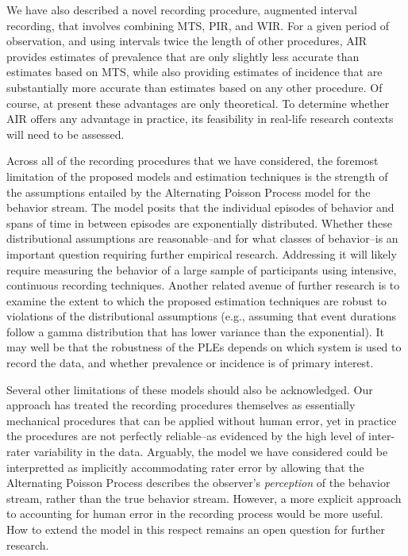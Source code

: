 \documentclass[man, noextraspace, floatsintext]{apa6}\usepackage[]{graphicx}\usepackage[]{color}
\begin{document}
We have also described a novel recording procedure, augmented interval recording, that involves combining MTS, PIR, and WIR. For a given period of observation, and using intervals twice the length of other procedures, AIR provides estimates of prevalence that are only slightly less accurate than estimates based on MTS, while also providing estimates of incidence that are substantially more accurate than estimates based on any other procedure. Of course, at present these advantages are only theoretical. To determine whether AIR offers any advantage in practice, its feasibility in real-life research contexts will need to be assessed.  

Across all of the recording procedures that we have considered, the foremost limitation of the proposed models and estimation techniques is the strength of the assumptions entailed by the Alternating Poisson Process model for the behavior stream. The model posits that the individual episodes of behavior and spans of time in between episodes are exponentially distributed. Whether these distributional assumptions are reasonable--and for what classes of behavior--is an important question requiring further empirical research. Addressing it will likely require measuring the behavior of a large sample of participants using intensive, continuous recording techniques. 
Another related avenue of further research is to examine the extent to which the proposed estimation techniques are robust to violations of the distributional assumptions (e.g., assuming that event durations follow a gamma distribution that has lower variance than the exponential). 
It may well be that the robustness of the PLEs depends on which system is used to record the data, and whether prevalence or incidence is of primary interest.

Several other limitations of these models should also be acknowledged. Our approach has treated the recording procedures themselves as essentially mechanical procedures that can be applied without human error, yet in practice the procedures are not perfectly reliable--as evidenced by the high level of inter-rater variability in the \citet{Johnson2014} data. Arguably, the model we have considered could be interpretted as implicitly accommodating rater error by allowing that the Alternating Poisson Process describes the observer's \textit{perception} of the behavior stream, rather than the true behavior stream. However, a more explicit approach to accounting for human error in the recording process would be more useful. How to extend the model in this respect remains an open question for further research.
\end{document}
